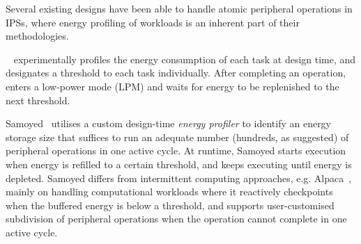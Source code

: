 
Several existing designs have been able to handle atomic peripheral operations in IPSs, where energy profiling of workloads is an inherent part of their methodologies.

\debs{}~\cite{gomez2016dynamic} experimentally profiles the energy consumption of each task at design time, and designates a threshold to each task individually.
After completing an operation, \debs{} enters a low-power mode (LPM) and waits for energy to be replenished to the next threshold. 

Samoyed~\cite{maeng2019supporting} utilises a custom design-time \textit{energy profiler} to identify an energy storage size that suffices to run an adequate number (hundreds, as suggested) of peripheral operations in one active cycle. 
At runtime, Samoyed starts execution when energy is refilled to a certain threshold, and keeps executing until energy is depleted. 
Samoyed differs from  intermittent computing approaches, e.g. Alpaca~\cite{maeng2017alpaca}, mainly on handling computational workloads where it reactively checkpoints when the buffered energy is below a threshold, and supports user-customised subdivision of peripheral operations when the operation cannot complete in one active cycle. 

